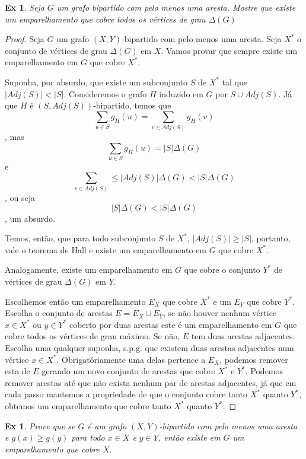 \documentclass[12pt]{article}
\newcounter{exCounter}
\newtheorem{ex}[exCounter]{Ex}
\begin{document}
\begin{ex}
Seja $G$ um grafo bipartido com pelo menos uma aresta. Mostre que existe um emparelhamento que cobre todos os vértices de grau $\Delta(G)$
\end{ex}

\begin{proof}
Seja $G$ um grafo $(X,Y)$-bipartido com pelo menos uma aresta. Seja $X^*$ o conjunto de vértices de grau $\Delta(G)$ em $X$. Vamos provar que sempre existe um emparelhamento em $G$ que cobre $X^*$.

Suponha, por absurdo, que existe um subconjunto $S$ de $X^*$ tal que $|Adj(S)| < |S|$. Consideremos o grafo $H$ induzido em $G$ por $S \cup Adj(S)$. Já que $H$ é $(S,Adj(S))$-bipartido, temos que
$$ \sum_{u \in S} g_H(u) = \sum_{v \in Adj(S)} g_H(v) $$, mas
$$ \sum_{u \in S} g_H(u) = |S| \Delta(G) $$ e
$$ \sum_{v \in Adj(S)} \leq |Adj(S)| \Delta(G) < |S| \Delta(G) $$, ou seja
$$ |S| \Delta(G) < |S| \Delta(G) $$, um absurdo.

Temos, então, que para todo subconjunto $S$ de $X^*$, $|Adj(S)| \geq |S|$, portanto, vale o teorema de Hall e existe um emparelhamento em $G$ que cobre $X^*$. 

Analogamente, existe um emparelhamento em $G$ que cobre o conjunto $Y^*$ de vértices de grau $\Delta(G)$ em $Y$.

Escolhemos então um emparelhamento $E_X$ que cobre $X^*$ e um $E_Y$ que cobre $Y^*$. Escolha o conjunto de arestas $E = E_X \cup E_Y$, se não houver nenhum vértice $x \in X^*$ ou $y \in Y^*$ coberto por duas arestas este é um emparelhamento em $G$ que cobre todos os vértices de grau máximo. Se não, $E$ tem duas arestas adjacentes. Escolha uma qualquer suponha, s.p.g. que existem duas arestas adjacentes num vértice $x \in X^*$. Obrigatóriamente uma delas pertence a $E_X$, podemos remover esta de $E$ gerando um novo conjunto de arestas que cobre $X^*$ e $Y^*$. Podemos remover arestas até que não exista nenhum par de arestas adjacentes, já que em cada passo mantemos a propriedade de que o conjunto cobre tanto $X^*$ quanto $Y^*$, obtemos um emparelhamento que cobre tanto $X^*$ quanto $Y^*$.
\end{proof}

\begin{ex}
Prove que se $G$ é um grafo $(X,Y)$-bipartido com pelo menos uma aresta e $g(x) \geq g(y)$ para todo $x \in X$ e $y \in Y$, então existe em $G$ um emparelhamento que cobre $X$.
\end{ex}
\end{document}
